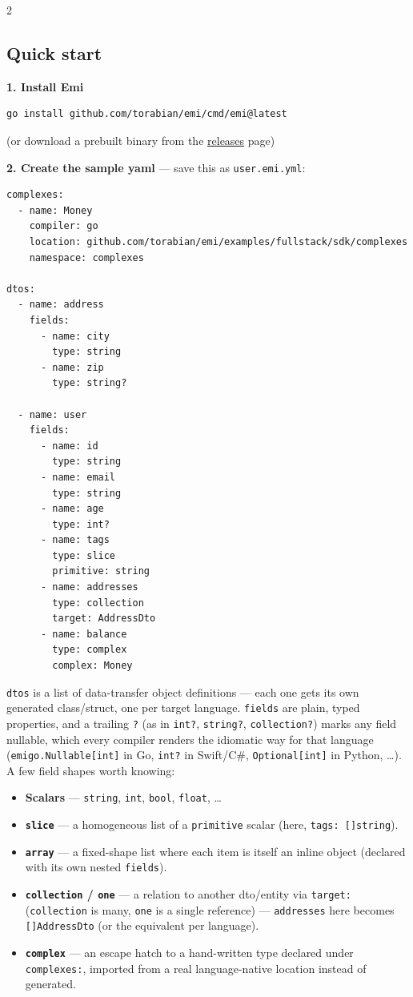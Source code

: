 \documentclass[10pt,a4paper]{extarticle}
\begin{document}
\begin{multicols}{2}
\subsection*{Quick start}

\textbf{1. Install Emi}
\begin{lstlisting}
go install github.com/torabian/emi/cmd/emi@latest
\end{lstlisting}
(or download a prebuilt binary from the
\href{https://github.com/torabian/emi/releases}{releases} page)

\textbf{2. Create the sample yaml} --- save this as \texttt{user.emi.yml}:
\begin{lstlisting}
complexes:
  - name: Money
    compiler: go
    location: github.com/torabian/emi/examples/fullstack/sdk/complexes
    namespace: complexes

dtos:
  - name: address
    fields:
      - name: city
        type: string
      - name: zip
        type: string?

  - name: user
    fields:
      - name: id
        type: string
      - name: email
        type: string
      - name: age
        type: int?
      - name: tags
        type: slice
        primitive: string
      - name: addresses
        type: collection
        target: AddressDto
      - name: balance
        type: complex
        complex: Money
\end{lstlisting}

\texttt{dtos} is a list of data-transfer object definitions --- each one
gets its own generated class/struct, one per target language.
\texttt{fields} are plain, typed properties, and a trailing \texttt{?}
(as in \texttt{int?}, \texttt{string?}, \texttt{collection?}) marks any
field nullable, which every compiler renders the idiomatic way for that
language (\texttt{emigo.Nullable[int]} in Go, \texttt{int?} in Swift/C\#,
\texttt{Optional[int]} in Python, \ldots). A few field shapes worth
knowing:
\begin{itemize}[leftmargin=1.3em,itemsep=2pt,topsep=2pt]
  \item \textbf{Scalars} --- \texttt{string}, \texttt{int}, \texttt{bool},
    \texttt{float}, \ldots
  \item \textbf{\texttt{slice}} --- a homogeneous list of a
    \texttt{primitive} scalar (here, \texttt{tags: []string}).
  \item \textbf{\texttt{array}} --- a fixed-shape list where each item is
    itself an inline object (declared with its own nested
    \texttt{fields}).
  \item \textbf{\texttt{collection} / \texttt{one}} --- a relation to
    another dto/entity via \texttt{target:} (\texttt{collection} is many,
    \texttt{one} is a single reference) --- \texttt{addresses} here
    becomes \texttt{[]AddressDto} (or the equivalent per language).
  \item \textbf{\texttt{complex}} --- an escape hatch to a hand-written
    type declared under \texttt{complexes:}, imported from a real
    language-native location instead of generated.
\end{itemize}


\end{multicols}
\end{document}
